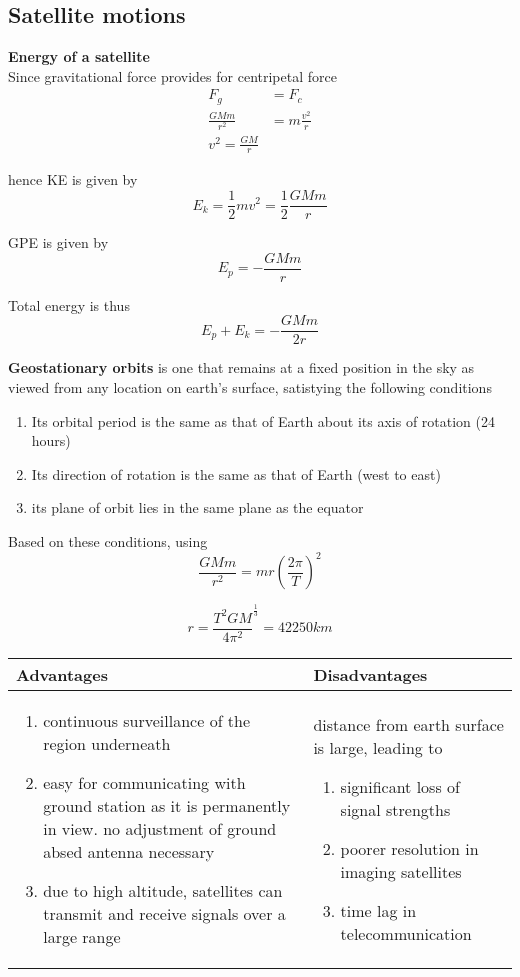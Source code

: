\documentclass[a4paper, 10pt]{article}
\begin{document}
\subsection{Satellite motions}
\textbf{Energy of a satellite} \\
Since gravitational force provides for centripetal force
\begin{align*}
   F_g &= F_c \\
   \frac{GMm}{r^2} &= m \frac{v^2}{r} \\
   v^2 = \frac{GM}{r}
\end{align*}	

hence KE is given by
\[
E_k = \frac{1}{2} mv^2 = \frac{1}{2} \frac{GMm}{r} 
\]

GPE is given by
\[
E_p = - \frac{GMm}{r}
\]

Total energy is thus 
\[
E_p + E_k = -\frac{GMm}{2r}
\]

\textbf{Geostationary orbits} is one that remains at a fixed position in the sky as viewed from any location on earth's surface, satistying the following conditions 
\begin{enumerate}
   \item Its orbital period is the same as that of Earth about its axis of rotation (24 hours)
   \item Its direction of rotation is the same as that of Earth (west to east)
   \item its plane of orbit lies in the same plane as the equator 
\end{enumerate}	

Based on these conditions, using 
\[
   \frac{GMm}{r^2} = mr \left( \frac{2\pi}{T}\right)^2 
\]

\[
   r = \frac{T^2 GM}{4\pi^2}^{\frac{1}{3}} = 42250km
\]

\begin{center}
   \begin{tabular}{L|L}
      Advantages & Disadvantages \\
      \hline
      \begin{enumerate}
         \item continuous surveillance of the region underneath 
         \item easy for communicating with ground station as it is permanently in view. no adjustment of ground absed antenna necessary
         \item due to high altitude, satellites can transmit and receive signals over a large range
      \end{enumerate}	
       & distance from earth surface is large, leading to 
      \begin{enumerate}
         \item significant loss of signal strengths
         \item poorer resolution in imaging satellites
         \item time lag in telecommunication 
      \end{enumerate}	\\
   \end{tabular}
\end{center}
\end{document}
